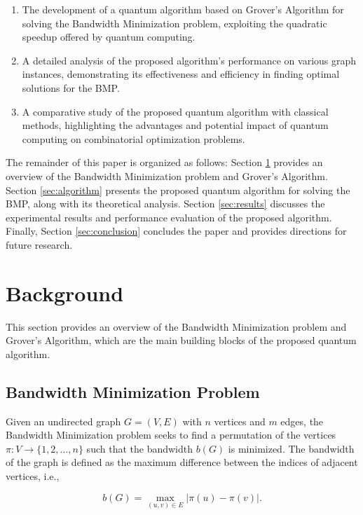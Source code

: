\begin{enumerate}
    \item The development of a quantum algorithm based on Grover's Algorithm for solving the Bandwidth Minimization problem, exploiting the quadratic speedup offered by quantum computing.
    
    \item A detailed analysis of the proposed algorithm's performance on various graph instances, demonstrating its effectiveness and efficiency in finding optimal solutions for the BMP.
    
    \item A comparative study of the proposed quantum algorithm with classical methods, highlighting the advantages and potential impact of quantum computing on combinatorial optimization problems.
\end{enumerate}

The remainder of this paper is organized as follows: Section \ref{sec:background} provides an overview of the Bandwidth Minimization problem and Grover's Algorithm. Section \ref{sec:algorithm} presents the proposed quantum algorithm for solving the BMP, along with its theoretical analysis. Section \ref{sec:results} discusses the experimental results and performance evaluation of the proposed algorithm. Finally, Section \ref{sec:conclusion} concludes the paper and provides directions for future research.

\section{Background}
\label{sec:background}

This section provides an overview of the Bandwidth Minimization problem and Grover's Algorithm, which are the main building blocks of the proposed quantum algorithm.

\subsection{Bandwidth Minimization Problem}
\label{subsec:bmp}

Given an undirected graph $G = (V, E)$ with $n$ vertices and $m$ edges, the Bandwidth Minimization problem seeks to find a permutation of the vertices $\pi: V \rightarrow \{1, 2, \ldots, n\}$ such that the bandwidth $b(G)$ is minimized. The bandwidth of the graph is defined as the maximum difference between the indices of adjacent vertices, i.e.,

\begin{equation}
b(G) = \max_{(u, v) \in E} |\pi(u) - \pi(v)|.
\end{equation}

